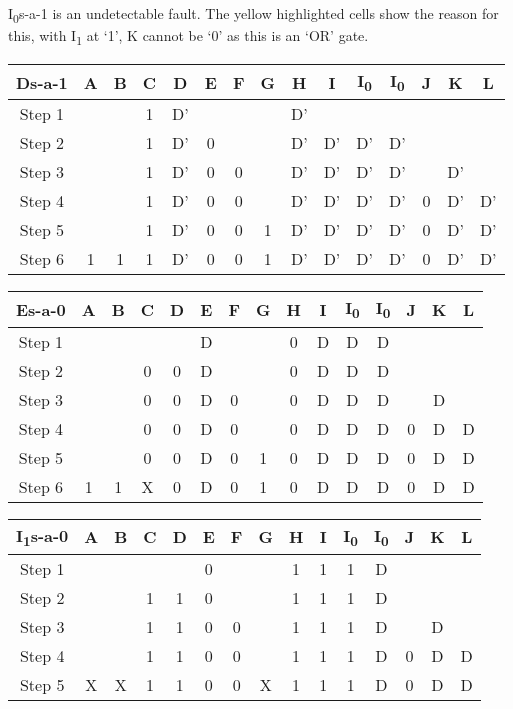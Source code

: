 \documentclass[11pt]{report}
\begin{document}
I\textsubscript{0}s-a-1 is an undetectable fault. The yellow highlighted cells show the reason for this, with I\textsubscript{1} at `1', K cannot be `0' as this is an `OR' gate.

\begin{tabular}{ |c||c|c|c|c|c|c|c|c|c|c|c|c|c|c| }
\hline
\bf Ds-a-1 & \bf A & \bf B & \bf C & \bf D & \bf E & \bf F & G & H & I & I\textsubscript{0} & I\textsubscript{0} & J & K & \bf L \\
\hline
\hline
Step 1 & & & 1 & D' & & & & D' & & & & & & \\
\hline
Step 2 & & & 1 & D' & 0 & & & D' & D' & D' & D' & & & \\
\hline
Step 3 & & & 1 & D' & 0 & 0 & & D' & D' & D' & D' & & D' & \\
\hline
Step 4 & & & 1 & D' & 0 & 0 & & D' & D' & D' & D' & 0 & D' & D' \\
\hline
Step 5 & & & 1 & D' & 0 & 0 & 1 & D' & D' & D' & D' & 0 & D' & D' \\
\hline
Step 6 & 1 & 1 & 1 & D' & 0 & 0 & 1 & D' & D' & D' & D' & 0 & D' & D' \\
\hline
\end{tabular}



\begin{tabular}{ |c||c|c|c|c|c|c|c|c|c|c|c|c|c|c| }
\hline
\bf Es-a-0 & \bf A & \bf B & \bf C & \bf D & \bf E & \bf F & G & H & I & I\textsubscript{0} & I\textsubscript{0} & J & K & \bf L \\
\hline
\hline
Step 1 & & & & & D & & & 0 & D & D & D & & & \\
\hline
Step 2 & & & 0 & 0 & D & & & 0 & D & D & D & & & \\
\hline
Step 3 & & & 0 & 0 & D & 0 & & 0 & D & D & D & & D & \\
\hline
Step 4 & & & 0 & 0 & D & 0 & & 0 & D & D & D & 0 & D & D \\
\hline
Step 5 & & & 0 & 0 & D & 0 & 1 & 0 & D & D & D & 0 & D & D \\
\hline
Step 6 & 1 & 1 & X & 0 & D & 0 & 1 & 0 & D & D & D & 0 & D & D \\
\hline
\end{tabular}



\begin{tabular}{ |c||c|c|c|c|c|c|c|c|c|c|c|c|c|c| }
\hline
\bf I\textsubscript{1}s-a-0 & \bf A & \bf B & \bf C & \bf D & \bf E & \bf F & G & H & I & I\textsubscript{0} & I\textsubscript{0} & J & K & \bf L \\
\hline
\hline
Step 1 & & & & & 0 & & & 1 & 1 & 1 & D & & & \\
\hline
Step 2 & & & 1 & 1 & 0 & & & 1 & 1 & 1 & D & & & \\
\hline
Step 3 & & & 1 & 1 & 0 & 0 & & 1 & 1 & 1 & D & & D & \\
\hline
Step 4 & & & 1 & 1 & 0 & 0 & & 1 & 1 & 1 & D & 0 & D & D \\
\hline
Step 5 & X & X & 1 & 1 & 0 & 0 & X & 1 & 1 & 1 & D & 0 & D & D \\
\hline
\end{tabular}
\end{document}
